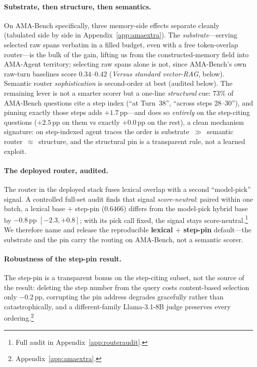 \documentclass{article} %
\newcommand{\pp}{\,\mathrm{pp}}
\begin{document}
\paragraph{Substrate, then structure, then semantics.}
On AMA-Bench specifically, three memory-side effects separate cleanly
(tabulated side by side in Appendix~\ref{app:amaextra}). The \emph{substrate}---serving selected raw spans verbatim in a filled budget,
even with a free token-overlap router---is the bulk of the gain, lifting us from the
constructed-memory field into AMA-Agent territory; selecting raw spans alone is not, since AMA-Bench's own raw-turn baselines score $0.34$--$0.42$ (\emph{Versus standard vector-RAG}, below). Semantic router
\emph{sophistication} is second-order at best (audited below).
The remaining lever is not a smarter scorer but a one-line \emph{structural} cue:
$73\%$ of AMA-Bench questions cite a step index (``at Turn~38'', ``across steps
28--30''), and pinning exactly those steps adds $+1.7\pp$---and does so
\emph{entirely} on the step-citing questions ($+2.5\pp$ on them vs exactly
$+0.0\pp$ on the rest), a clean mechanism signature: on step-indexed agent traces
the order is substrate~$\gg$~semantic router~$\approx$~structure, and the structural
pin is a transparent rule, not a learned exploit.

\paragraph{The deployed router, audited.}
The router in the deployed stack fuses lexical overlap with a second
``model-pick'' signal. A controlled full-set audit finds that signal
\emph{score-neutral}: paired within one batch, a lexical base $+$ step-pin ($0.6466$) differs from
the model-pick hybrid base by $-0.8\pp$ $[-2.3,+0.8]$; with its pick call fixed, the signal stays score-neutral.\footnote{Full audit in
Appendix~\ref{app:routeraudit}.} We therefore name and release the reproducible
\textbf{lexical $+$ step-pin} default---the substrate and the pin carry the routing
on AMA-Bench, not a semantic scorer.

\paragraph{Robustness of the step-pin result.} The step-pin is a transparent bonus
on the step-citing subset, not the source of the result: deleting the step number
from the query costs content-based selection only $-0.2\pp$, corrupting the pin
address degrades gracefully rather than catastrophically, and a different-family
Llama-3.1-8B judge preserves every ordering.\footnote{Appendix~\ref{app:amaextra}.}
\end{document}
